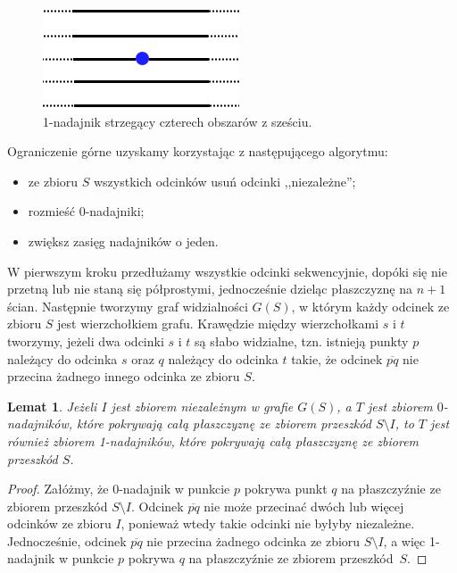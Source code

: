 \documentclass[brudnopis]{xmgr}
\newtheorem{Lemat}{Lemat}
\theoremstyle{definition}
\begin{document}
\begin{figure}[ht!]
  \centering
  \includegraphics{rysunki/k_nadajniki_ogr_dolne.png}
  \caption{1-nadajnik strzegący czterech obszarów z sześciu.}
  \label{fig:ogr_dolne}
\end{figure} 

Ograniczenie górne uzyskamy korzystając z następującego algorytmu:
\begin{itemize}
  \item ze zbioru $S$ wszystkich odcinków usuń odcinki ,,niezależne'';
  \item rozmieść 0-nadajniki;
  \item zwiększ zasięg nadajników o jeden.
\end{itemize}

W pierwszym kroku przedłużamy wszystkie odcinki sekwencyjnie, dopóki się nie przetną lub nie staną się półprostymi, jednocześnie dzieląc płaszczyznę na $n + 1$ ścian. Następnie tworzymy graf widzialności $G(S)$, w którym każdy odcinek ze zbioru $S$ jest wierzchołkiem grafu. Krawędzie między wierzchołkami $s$ i $t$ tworzymy, jeżeli dwa odcinki $s$ i $t$ są słabo widzialne, tzn. istnieją punkty $p$ należący do odcinka $s$ oraz $q$ należący do odcinka $t$ takie, że odcinek $\overline{pq}$ nie przecina żadnego innego odcinka ze zbioru $S$.

\begin{Lemat}\label{0-1-nadajniki} \cite{knadajniki}
  Jeżeli $I$ jest zbiorem niezależnym w grafie $G(S)$, a $T$ jest zbiorem $0$-nadajników, które pokrywają całą płaszczyznę ze zbiorem przeszkód $S \setminus I$, to $T$ jest również zbiorem 1-nadajników, które pokrywają całą płaszczyznę ze zbiorem przeszkód $S$.
\end{Lemat}

\begin{proof}
  Załóżmy, że 0-nadajnik w punkcie $p$ pokrywa punkt $q$ na płaszczyźnie ze zbiorem przeszkód $S \setminus I$. Odcinek $\overline{pq}$ nie może przecinać dwóch lub więcej odcinków ze zbioru $I$, ponieważ wtedy takie odcinki nie byłyby niezależne. Jednocześnie, odcinek $\overline{pq}$ nie przecina żadnego odcinka ze zbioru $S \setminus I$, a więc 1-nadajnik w punkcie $p$ pokrywa $q$ na płaszczyźnie ze zbiorem \mbox{przeszkód $S$.}
\end{proof}
\end{document}
